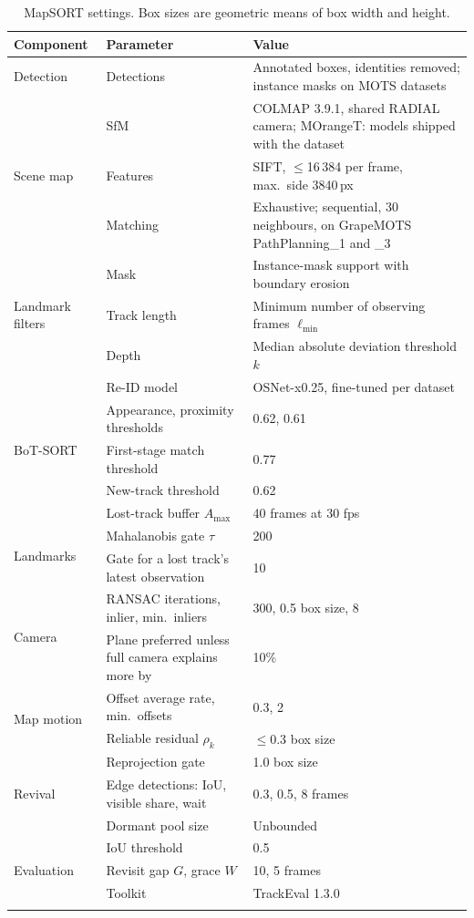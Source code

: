 \documentclass[pdflatex,sn-basic]{sn-jnl}%
\theoremstyle{thmstyleone}%
\begin{document}
\begin{table}[t]
\caption{MapSORT settings. Box sizes are geometric means of box width and height.}\label{tab:hparams}
\footnotesize
\begin{tabular*}{\textwidth}{@{\extracolsep\fill}llp{}@{}}
\toprule
Component & Parameter & Value \\
\midrule
Detection & Detections & Annotated boxes, identities removed; instance masks on MOTS datasets \\
\midrule
\multirow{3}{*}{Scene map} & SfM & COLMAP 3.9.1, shared RADIAL camera; MOrangeT: models shipped with the dataset \\
 & Features & SIFT, $\le$16\,384 per frame, max.\ side 3840\,px \\
 & Matching & Exhaustive; sequential, 30 neighbours, on GrapeMOTS PathPlanning\_1 and \_3 \\
\midrule
\multirow{3}{*}{Landmark filters} & Mask & Instance-mask support with boundary erosion \\
 & Track length & Minimum number of observing frames $\ell_{\min}$ \\
 & Depth & Median absolute deviation threshold $k$ \\
\midrule
\multirow{5}{*}{BoT-SORT} & Re-ID model & OSNet-x0.25, fine-tuned per dataset \\
 & Appearance, proximity thresholds & 0.62, 0.61 \\
 & First-stage match threshold & 0.77 \\
 & New-track threshold & 0.62 \\
 & Lost-track buffer $A_{\max}$ & 40 frames at 30 fps \\
\midrule
\multirow{2}{*}{Landmarks} & Mahalanobis gate $\tau$ & 200 \\
 & Gate for a lost track's latest observation & 10 \\
\midrule
\multirow{2}{*}{Camera} & RANSAC iterations, inlier, min.\ inliers & 300, 0.5 box size, 8 \\
 & Plane preferred unless full camera explains more by & 10\% \\
\midrule
\multirow{2}{*}{Map motion} & Offset average rate, min.\ offsets & 0.3, 2 \\
 & Reliable residual $\rho_k$ & $\le$0.3 box size \\
\midrule
\multirow{3}{*}{Revival} & Reprojection gate & 1.0 box size \\
 & Edge detections: IoU, visible share, wait & 0.3, 0.5, 8 frames \\
 & Dormant pool size & Unbounded \\
\midrule
\multirow{3}{*}{Evaluation} & IoU threshold & 0.5 \\
 & Revisit gap $G$, grace $W$ & 10, 5 frames \\
 & Toolkit & TrackEval 1.3.0 \\
\botrule
\end{tabular*}
\end{table}
\end{document}
